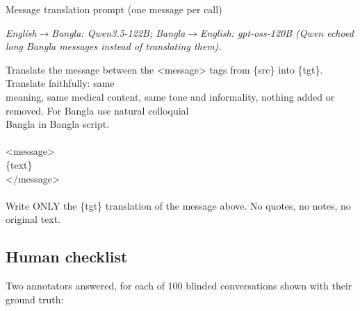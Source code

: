\begin{promptbox}{Message translation prompt (one message per call)}
{\footnotesize\itshape English$\rightarrow$Bangla: Qwen3.5-122B; Bangla$\rightarrow$English: gpt-oss-120B (Qwen echoed long Bangla messages instead of translating them).\par}\smallskip
\par{\ttfamily\scriptsize\raggedright Translate the message between the \textless{}message\textgreater{} tags from \{src\} into \{tgt\}. Translate faithfully: same \\\relax
meaning, same medical content, same tone and informality, nothing added or removed. For Bangla use natural colloquial \\\relax
Bangla in Bangla script. \\\relax
\mbox{} \\\relax
\textless{}message\textgreater{} \\\relax
\{text\} \\\relax
\textless{}/message\textgreater{} \\\relax
\mbox{} \\\relax
Write ONLY the \{tgt\} translation of the message above. No quotes, no notes, no original text.\par}
\end{promptbox}

\subsection{Human checklist}\label{app:p:check}

Two annotators answered, for each of 100 blinded conversations shown with their ground truth:

